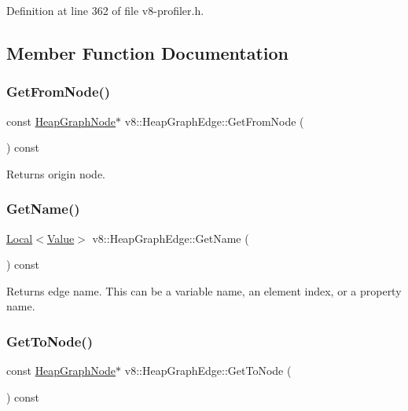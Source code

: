 Definition at line 362 of file v8-\/profiler.\+h.



\subsection{Member Function Documentation}
\mbox{\label{classv8_1_1HeapGraphEdge_a2d730f01c04209726ee3d35524e66113}} 
\subsubsection{\texorpdfstring{Get\+From\+Node()}{GetFromNode()}}
{\footnotesize\ttfamily const \mbox{\hyperlink{classv8_1_1HeapGraphNode}{Heap\+Graph\+Node}}$\ast$ v8\+::\+Heap\+Graph\+Edge\+::\+Get\+From\+Node (\begin{DoxyParamCaption}{ }\end{DoxyParamCaption}) const}

Returns origin node. \mbox{\label{classv8_1_1HeapGraphEdge_a05c82a383b42324b73506abc4c82f584}} 
\subsubsection{\texorpdfstring{Get\+Name()}{GetName()}}
{\footnotesize\ttfamily \mbox{\hyperlink{classv8_1_1Local}{Local}}$<$\mbox{\hyperlink{classv8_1_1Value}{Value}}$>$ v8\+::\+Heap\+Graph\+Edge\+::\+Get\+Name (\begin{DoxyParamCaption}{ }\end{DoxyParamCaption}) const}

Returns edge name. This can be a variable name, an element index, or a property name. \mbox{\label{classv8_1_1HeapGraphEdge_a7db892a422357ca83d9803b923e30452}} 
\subsubsection{\texorpdfstring{Get\+To\+Node()}{GetToNode()}}
{\footnotesize\ttfamily const \mbox{\hyperlink{classv8_1_1HeapGraphNode}{Heap\+Graph\+Node}}$\ast$ v8\+::\+Heap\+Graph\+Edge\+::\+Get\+To\+Node (\begin{DoxyParamCaption}{ }\end{DoxyParamCaption}) const}

